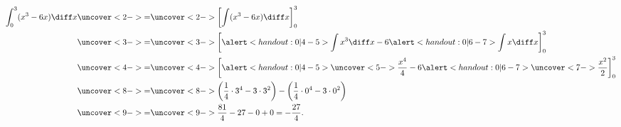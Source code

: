 \begin{frame}
\begin{example} %
\abovedisplayskip=0pt
\belowdisplayskip=0pt
\abovedisplayshortskip=0pt
\belowdisplayshortskip=0pt
\begin{align*}
\int_0^3 (x^3 - 6x)\diff x %
& \uncover<2->{=}  \uncover<2->{\left[ \int (x^3 - 6x)\diff x  \right]_0^3}\\%
& \uncover<3->{=}  \uncover<3->{\left[ \alert<handout:0| 4-5>{\int x^3 \diff x} - 6\alert<handout:0| 6-7>{\int x \diff x}  \right]_0^3}\\%
& \uncover<4->{=}  \uncover<4->{\left[ \alert<handout:0| 4-5>{\uncover<5->{\frac{x^4}{4}}} - 6\alert<handout:0| 6-7>{\uncover<7->{\frac{x^2}{2}}}  \right]_0^3}\\%
& \uncover<8->{=}  \uncover<8->{ \left( \frac{1}{4} \cdot 3^4 - 3\cdot 3^2 \right) - \left( \frac{1}{4}\cdot 0^4 - 3\cdot 0^2  \right) }\\%
& \uncover<9->{=}  \uncover<9->{ \frac{81}{4} - 27 - 0 + 0 = -\frac{27}{4}.}
\end{align*}
\end{example}
\end{frame}

